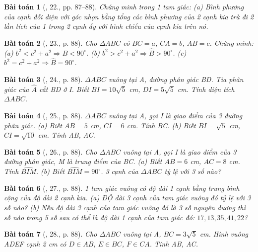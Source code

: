 \documentclass{article}
\newtheorem{baitoan}{Bài toán}
\begin{document}
\begin{baitoan}[\cite{Binh_Toan_9_tap_1}, 22., pp. 87--88]
	Chứng minh trong 1 tam giác: (a) Bình phương của cạnh đối diện với góc nhọn bằng tổng các bình phương của 2 cạnh kia trừ đi 2 lần tích của 1 trong 2 cạnh ấy với hình chiếu của cạnh kia trên nó.
\end{baitoan}

\begin{baitoan}[\cite{Binh_Toan_9_tap_1}, 23., p. 88]
	Cho $\Delta ABC$ có $BC = a$, $CA = b$, $AB = c$. Chứng minh: (a) $b^2 < c^2 + a^2\Rightarrow\widehat{B} < 90^\circ$. (b) $b^2 > c^2 + a^2\Rightarrow\widehat{B} > 90^\circ$. (c) $b^2 = c^2 + a^2\Rightarrow\widehat{B} = 90^\circ$.
\end{baitoan}

\begin{baitoan}[\cite{Binh_Toan_9_tap_1}, 24., p. 88]
	$\Delta ABC$ vuông tại A, đường phân giác BD. Tia phân giác của $\widehat{A}$ cắt BD ở I. Biết $BI = 10\sqrt{5}$ {\rm cm}, $DI = 5\sqrt{5}$ {\rm cm}. Tính diện tích $\Delta ABC$.
\end{baitoan}

\begin{baitoan}[\cite{Binh_Toan_9_tap_1}, 25., p. 88]
	$\Delta ABC$ vuông tại A, gọi I là giao điểm của 3 đường phân giác. (a) Biết $AB = 5$ {\rm cm}, $CI = 6$ {\rm cm}. Tính BC. (b) Biết $BI = \sqrt{5}$ {\rm cm}, $CI = \sqrt{10}$ {\rm cm}. Tính AB, AC.
\end{baitoan}

\begin{baitoan}[\cite{Binh_Toan_9_tap_1}, 26., p. 88]
	Cho $\Delta ABC$ vuông tại A, gọi I là giao điểm của 3 đường phân giác, M là trung điểm của BC. (a) Biết $AB = 6$ {\rm cm}, $AC = 8$ {\rm cm}. Tính $\widehat{BIM}$. (b) Biết $\widehat{BIM} = 90^\circ$. 3 cạnh của $\Delta ABC$ tỷ lệ với 3 số nào?
\end{baitoan}

\begin{baitoan}[\cite{Binh_Toan_9_tap_1}, 27., p. 88]
	1 tam giác vuông có độ dài 1 cạnh bằng trung bình cộng của độ dài 2 cạnh kia. (a) ĐỘ dài 3 cạnh của tam giác vuông đó tỷ lệ với 3 số nào? (b) Nếu độ dài 3 cạnh của tam giác vuông đó là 3 số nguyên dương thì số nào trong 5 số sau có thể là độ dài 1 cạnh của tam giác đó: $17,13,35,41,22$?
\end{baitoan}

\begin{baitoan}[\cite{Binh_Toan_9_tap_1}, 28., p. 88]
	Cho $\Delta ABC$ vuông tại A, $BC = 3\sqrt{5}$ {\rm cm}. Hình vuông ADEF cạnh {\rm2 cm} có $D\in AB$, $E\in BC$, $F\in CA$. Tính AB, AC.
\end{baitoan}
\end{document}
